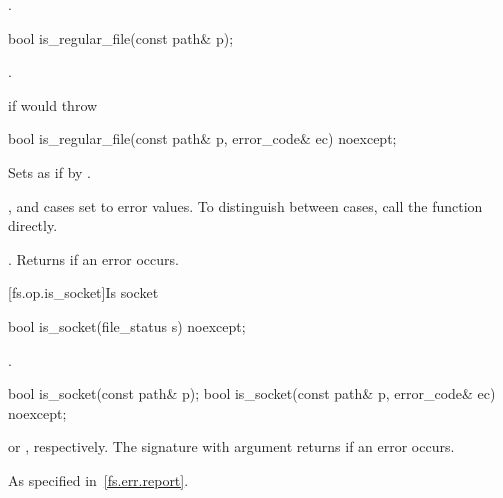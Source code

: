 \begin{itemdescr}
\pnum
\returns {}.
\end{itemdescr}

%
\begin{itemdecl}
bool is_regular_file(const path& p);
\end{itemdecl}

\begin{itemdescr}
\pnum
\returns {}.

\pnum
\throws {} if  would throw 
\end{itemdescr}

%
\begin{itemdecl}
bool is_regular_file(const path& p, error_code& ec) noexcept;
\end{itemdecl}

\begin{itemdescr}
\pnum
\effects Sets  as if by . \begin{note}
,  and
   cases set  to error values. To distinguish between cases, call the  function directly. \end{note}

\pnum
\returns {}.
Returns  if an error occurs.
\end{itemdescr}


[fs.op.is_socket]{Is socket}

%
\begin{itemdecl}
bool is_socket(file_status s) noexcept;
\end{itemdecl}

\begin{itemdescr}
\pnum
\returns {}.
\end{itemdescr}

%
\begin{itemdecl}
bool is_socket(const path& p);
bool is_socket(const path& p, error_code& ec) noexcept;
\end{itemdecl}

\begin{itemdescr}
\pnum
\returns {} or
  , respectively. The signature with argument
   returns  if an error occurs.

\pnum
\throws As specified in~\ref{fs.err.report}.
\end{itemdescr}


